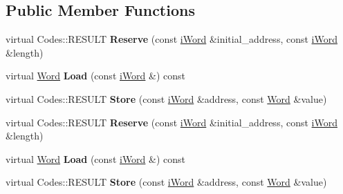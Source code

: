\subsection*{Public Member Functions}
\begin{DoxyCompactItemize}
\item 
\hypertarget{classMemory_a80cd994d4833dde66b8005184e510dda}{
virtual Codes::RESULT {\bfseries Reserve} (const \hyperlink{classiWord}{iWord} \&initial\_\-address, const \hyperlink{classiWord}{iWord} \&length)}
\label{classMemory_a80cd994d4833dde66b8005184e510dda}

\item 
\hypertarget{classMemory_aca021609915080b38ca1b00d9b416e80}{
virtual \hyperlink{classWord}{Word} {\bfseries Load} (const \hyperlink{classiWord}{iWord} \&) const }
\label{classMemory_aca021609915080b38ca1b00d9b416e80}

\item 
\hypertarget{classMemory_a23703464fb24710d09be1b2010e79edc}{
virtual Codes::RESULT {\bfseries Store} (const \hyperlink{classiWord}{iWord} \&address, const \hyperlink{classWord}{Word} \&value)}
\label{classMemory_a23703464fb24710d09be1b2010e79edc}

\item 
\hypertarget{classMemory_afe683401c1656b0a077d5f666f9c8d51}{
virtual Codes::RESULT {\bfseries Reserve} (const \hyperlink{classiWord}{iWord} \&initial\_\-address, const \hyperlink{classiWord}{iWord} \&length)}
\label{classMemory_afe683401c1656b0a077d5f666f9c8d51}

\item 
\hypertarget{classMemory_af043b481b061644f9ff6cd7288655c93}{
virtual \hyperlink{classWord}{Word} {\bfseries Load} (const \hyperlink{classiWord}{iWord} \&) const }
\label{classMemory_af043b481b061644f9ff6cd7288655c93}

\item 
\hypertarget{classMemory_a100745221ade9b322743514d91fcce23}{
virtual Codes::RESULT {\bfseries Store} (const \hyperlink{classiWord}{iWord} \&address, const \hyperlink{classWord}{Word} \&value)}
\label{classMemory_a100745221ade9b322743514d91fcce23}

\end{DoxyCompactItemize}
